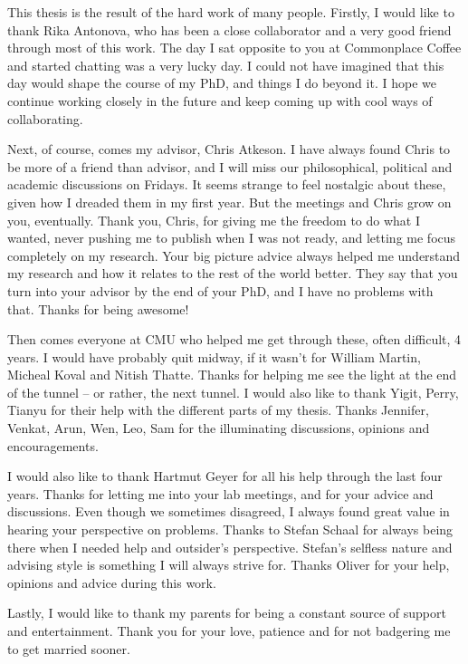 
\begin{acknowledgements}
\addchaptertocentry{\acknowledgementname} %

This thesis is the result of the hard work of many people. Firstly, I would like to thank Rika Antonova, who has been a close collaborator and a very good friend through most of this work. The day I sat opposite to you at Commonplace Coffee and started chatting was a very lucky day. I could not have imagined that this day would shape the course of my PhD, and things I do beyond it. I hope we continue working closely in the future and keep coming up with cool ways of collaborating. 

Next, of course, comes my advisor, Chris Atkeson. I have always found Chris to be more of a friend than advisor, and I will miss our philosophical, political and academic discussions on Fridays. It seems strange to feel nostalgic about these, given how I dreaded them in my first year. But the meetings and Chris grow on you, eventually. Thank you, Chris, for giving me the freedom to do what I wanted, never pushing me to publish when I was not ready, and letting me focus completely on my research. Your big picture advice always helped me understand my research and how it relates to the rest of the world better. They say that you turn into your advisor by the end of your PhD, and I have no problems with that. Thanks for being awesome!

Then comes everyone at CMU who helped me get through these, often difficult, 4 years. I would have probably quit midway, if it wasn't for William Martin, Micheal Koval and Nitish Thatte. Thanks for helping me see the light at the end of the tunnel -- or rather, the next tunnel. I would also like to thank Yigit, Perry, Tianyu for their help with the different parts of my thesis. Thanks Jennifer, Venkat, Arun, Wen, Leo, Sam for the illuminating discussions, opinions and encouragements. 

I would also like to thank Hartmut Geyer for all his help through the last four years. Thanks for letting me into your lab meetings, and for your advice and discussions. Even though we sometimes disagreed, I always found great value in hearing your perspective on problems. Thanks to Stefan Schaal for always being there when I needed help and outsider's perspective. Stefan's selfless nature and advising style is something I will always strive for. Thanks Oliver for your help, opinions and advice during this work. 

Lastly, I would like to thank my parents for being a constant source of support and entertainment. Thank you for your love, patience and for not badgering me to get married sooner.

\end{acknowledgements}